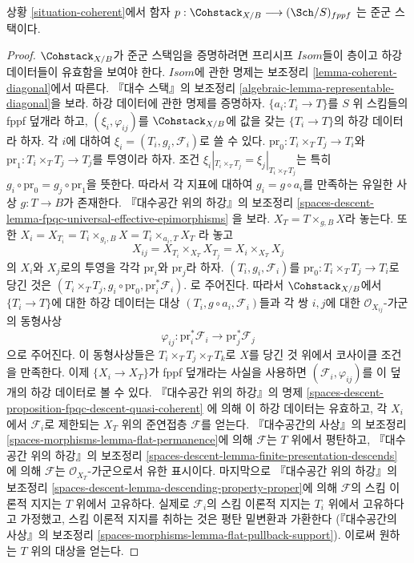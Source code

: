 \begin{lemma}
\label{lemma-coherent-stack}
상황 \ref{situation-coherent}에서 함자
$p : \Cohstack_{X/B} \longrightarrow (\Sch/S)_{fppf}$
는 준군 스택이다.
\end{lemma}

\begin{proof}
$\Cohstack_{X/B}$가 준군 스택임을 증명하려면 프리시프
$\mathit{Isom}$들이 층이고 하강 데이터들이 유효함을 보여야 한다.
$\mathit{Isom}$에 관한 명제는 보조정리
\ref{lemma-coherent-diagonal}에서 따른다. 『대수 스택』의 보조정리
\ref{algebraic-lemma-representable-diagonal}을 보라.
하강 데이터에 관한 명제를 증명하자.
$\{a_i : T_i \to T\}$를 $S$ 위 스킴들의 fppf 덮개라 하고,
$(\xi_i, \varphi_{ij})$를 $\Cohstack_{X/B}$에 값을 갖는
$\{T_i \to T\}$의 하강 데이터라 하자. 각 $i$에 대하여
$\xi_i = (T_i, g_i, \mathcal{F}_i)$로 쓸 수 있다.
$\text{pr}_0 : T_i \times_T T_j \to T_i$와
$\text{pr}_1 : T_i \times_T T_j \to T_j$를 투영이라 하자.
조건 $\xi_i|_{T_i \times_T T_j} = \xi_j|_{T_i \times_T T_j}$는 특히
$g_i \circ \text{pr}_0 = g_j \circ \text{pr}_1$을 뜻한다.
따라서 각 지표에 대하여 $g_i = g \circ a_i$를 만족하는 유일한 사상
$g : T \to B$가 존재한다. 『대수공간 위의 하강』의 보조정리
\ref{spaces-descent-lemma-fpqc-universal-effective-epimorphisms}
을 보라. $X_T = T \times_{g, B} X$라 놓는다. 또한
$X_i = X_{T_i} = T_i \times_{g_i, B} X = T_i \times_{a_i, T} X_T$
라 놓고
$$
X_{ij} = X_{T_i} \times_{X_T} X_{T_j} = X_i \times_{X_T} X_j
$$
의 $X_i$와 $X_j$로의 투영을 각각 $\text{pr}_i$와
$\text{pr}_j$라 하자. $(T_i, g_i, \mathcal{F}_i)$를
$\text{pr}_0 : T_i \times_T T_j \to T_i$로 당긴 것은
$(T_i \times_T T_j, g_i \circ \text{pr}_0, \text{pr}_i^*\mathcal{F}_i)$.
로 주어진다. 따라서 $\Cohstack_{X/B}$에서 $\{T_i \to T\}$에
대한 하강 데이터는 대상 $(T_i, g \circ a_i, \mathcal{F}_i)$들과
각 쌍 $i, j$에 대한 $\mathcal{O}_{X_{ij}}$-가군의 동형사상
$$
\varphi_{ij} :
\text{pr}_i^*\mathcal{F}_i \longrightarrow \text{pr}_j^*\mathcal{F}_j
$$
으로 주어진다. 이 동형사상들은 $T_i \times_T T_j \times_T T_k$로
$X$를 당긴 것 위에서 코사이클 조건을 만족한다.
이제 $\{X_i \to X_T\}$가 fppf 덮개라는 사실을 사용하면
$(\mathcal{F}_i, \varphi_{ij})$를 이 덮개의 하강 데이터로 볼 수 있다.
『대수공간 위의 하강』의 명제
\ref{spaces-descent-proposition-fpqc-descent-quasi-coherent}
에 의해 이 하강 데이터는 유효하고, 각 $X_i$에서
$\mathcal{F}_i$로 제한되는 $X_T$ 위의 준연접층 $\mathcal{F}$를 얻는다.
『대수공간의 사상』의 보조정리
\ref{spaces-morphisms-lemma-flat-permanence}에 의해
$\mathcal{F}$는 $T$ 위에서 평탄하고, 『대수공간 위의 하강』의 보조정리
\ref{spaces-descent-lemma-finite-presentation-descends}
에 의해 $\mathcal{F}$는 $\mathcal{O}_{X_T}$-가군으로서 유한 표시이다.
마지막으로 『대수공간 위의 하강』의 보조정리
\ref{spaces-descent-lemma-descending-property-proper}에 의해
$\mathcal{F}$의 스킴 이론적 지지는 $T$ 위에서 고유하다.
실제로 $\mathcal{F}_i$의 스킴 이론적 지지는 $T_i$ 위에서 고유하다고
가정했고, 스킴 이론적 지지를 취하는 것은 평탄 밑변환과 가환한다
(『대수공간의 사상』의 보조정리
\ref{spaces-morphisms-lemma-flat-pullback-support}).
이로써 원하는 $T$ 위의 대상을 얻는다.
\end{proof}

